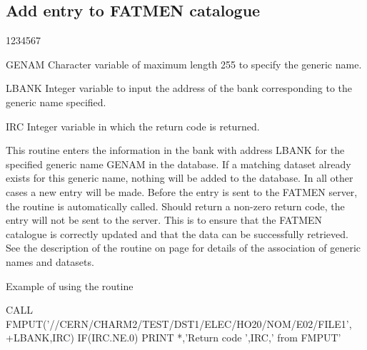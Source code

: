 \subsection{Add entry to FATMEN catalogue}
\begin{DLtt}{1234567}
\item[GENAM]
Character variable of maximum length 255 to specify the generic name.
\item[LBANK]
Integer variable to input the address of the bank corresponding
to the generic name specified.
\item[IRC]
Integer variable in which the return code is returned.
\end{DLtt}
\par
This routine enters the information in the bank with address LBANK
for the specified generic name GENAM in the database.
If a matching dataset already exists for this generic name, nothing
will be added to the database. In all other cases a new entry will
be made.
Before the entry is sent to the FATMEN server, the routine 
is automatically called. Should  return a non-zero return
code, the entry will not be sent to the server. This is to ensure
that the FATMEN catalogue is correctly updated and that the data
can be successfully retrieved.
See the description of the  routine on 
page \pageref{FMCOMP} for details of the association
of generic names and datasets.
\begin{XMPt}{Example of using the \protect{} routine}
 
      CALL FMPUT('//CERN/CHARM2/TEST/DST1/ELEC/HO20/NOM/E02/FILE1',
     +LBANK,IRC)
      IF(IRC.NE.0) PRINT *,'Return code ',IRC,' from FMPUT'
\end{XMPt}
 
